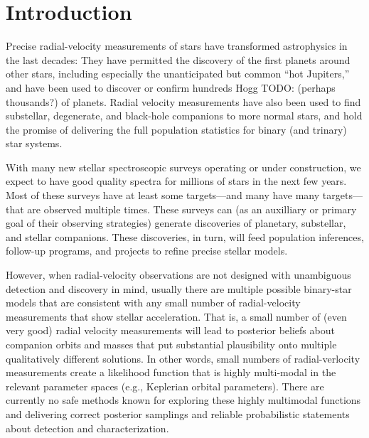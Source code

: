 \documentclass[manuscript, letterpaper]{aastex6}
\newcommand{\todohogg}[1]{{\color{green}Hogg TODO: #1}}
\begin{document}

\section{Introduction} \label{sec:intro}

Precise radial-velocity measurements of stars have transformed
astrophysics in the last decades:
They have permitted the discovery of the first planets around other stars,
including especially the unanticipated but common ``hot Jupiters,''
and have been used to discover or confirm hundreds
\todohogg{(perhaps thousands?)} of planets.
Radial velocity measurements have also been used to find substellar,
degenerate, and black-hole companions to more normal stars, and hold
the promise of delivering the full population statistics for binary
(and trinary) star systems.

With many new stellar spectroscopic surveys operating or under
construction, we expect to have good quality spectra for millions
of stars in the next few years.
Most of these surveys have at least some targets---and many have many
targets---that are observed multiple times.
These surveys can (as an auxilliary or primary goal of their observing
strategies) generate discoveries of planetary, substellar, and stellar
companions.
These discoveries, in turn, will feed population inferences, follow-up
programs, and projects to refine precise stellar models.

However, when radial-velocity observations are not designed with
unambiguous detection and discovery in mind, usually there are
multiple possible binary-star models that are consistent with any
small number of radial-velocity measurements that show stellar
acceleration.
That is, a small number of (even very good) radial velocity
measurements will lead to posterior beliefs about companion orbits and
masses that put substantial plausibility onto multiple qualitatively
different solutions.
In other words, small numbers of radial-verlocity measurements create a
likelihood function that is highly multi-modal in the relevant parameter spaces
(e.g., Keplerian orbital parameters).
There are currently no safe methods known for exploring these highly
multimodal functions and delivering correct posterior samplings and
reliable probabilistic statements about detection and
characterization.
\end{document}
